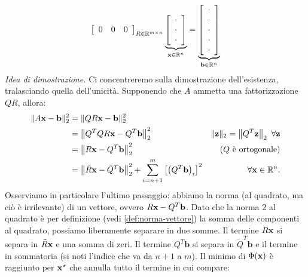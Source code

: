 \begin{equation*}
{\begin{bmatrix}
\begin{array}{ c c c }
0 & 0 & 0
\end{array}
\end{bmatrix}}_{R\in \mathbb{R}^{m\times n}}\underbrace{\begin{bmatrix}
\begin{array}{ c }
\cdot \\
\cdot \\
\cdot
\end{array}
\end{bmatrix}}_{\mathbf{x} \in \mathbb{R}^{n}} =\underbrace{\begin{bmatrix}
\begin{array}{ c }
\cdot \\
\cdot \\
\cdot \\
\cdot \\
\cdot
\end{array}
\end{bmatrix}}_{\mathbf{b} \in \mathbb{R}^{n}}
\end{equation*}
\textit{Idea di dimostrazione.} Ci concentreremo sulla dimostrazione dell'esistenza, tralasciando quella dell'unicità. Supponendo che $A$ ammetta una fattorizzazione $QR$, allora:
\begin{align*}
\Vert A\x -\mathbf{b}\Vert ^{2}_{2} & =\Vert QR\x -\mathbf{b}\Vert ^{2}_{2} & \\
 & =\left\Vert Q^{T} QR\x -Q^{T}\mathbf{b}\right\Vert ^{2}_{2} & \Vert \mathbf{z}\Vert _{2} =\left\Vert Q^{T}\mathbf{z}\right\Vert _{2} \ \forall \mathbf{z}\\
 & =\left\Vert R\x -Q^{T}\mathbf{b}\right\Vert ^{2}_{2} & \text{($Q$ è ortogonale)}\\
 & =\left\Vert \tilde{R}\x -\tilde{Q}^{T}\mathbf{b}\right\Vert ^{2}_{2} +\sum ^{m}_{i=n+1}\left[\left( Q^{T}\mathbf{b}\right)_{i}\right]^{2} & \forall \x \in \mathbb{R}^{n}.
\end{align*}
Osserviamo in particolare l'ultimo passaggio: abbiamo la norma (al quadrato, ma ciò è irrilevante) di un vettore, ovvero $R\mathbf{x} -Q^{T}\mathbf{b}$. Dato che la norma $2$ al quadrato è per definizione (vedi \ref{def:norma-vettore}) la somma delle componenti al quadrato, possiamo liberamente separare in due somme.
Il termine $R\mathbf{x}$ si separa in $\tilde{R}\mathbf{x}$ e una somma di zeri.
Il termine $Q^{T}\mathbf{b}$ si separa in $\tilde{Q}^{T}\mathbf{b}$ e il termine in sommatoria (si noti l'indice che va da $n+1$ a $m$).
Il minimo di $\Phi (\mathbf{x})$ è raggiunto per $\mathbf{x}^{\star }$ che annulla tutto il termine in cui compare:
